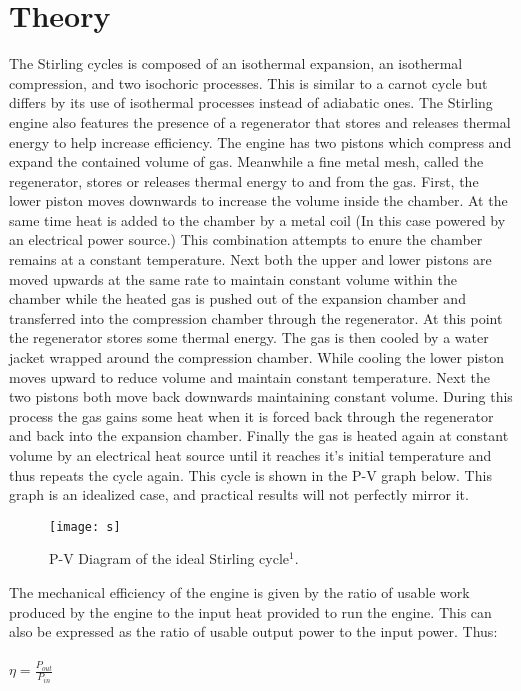 \documentclass{article}
\begin{document}
\section{Theory}
The Stirling cycles is composed of an isothermal expansion, an isothermal compression, and two isochoric processes. This is similar to a carnot cycle but differs by its use of isothermal processes instead of adiabatic ones. The Stirling engine also features the presence of a regenerator that stores and releases thermal energy to help increase efficiency. The engine has two pistons which compress and expand the contained volume of gas. Meanwhile a fine metal mesh, called the regenerator, stores or releases thermal energy to and from the gas. First, the lower piston moves downwards to increase the volume inside the chamber. At the same time heat is added to the chamber by a metal coil (In this case powered by an electrical power source.) This combination attempts to enure the chamber remains at a constant temperature. Next both the upper and lower pistons are moved upwards at the same rate to maintain constant volume within the chamber while the heated gas is pushed out of the expansion chamber and transferred into the compression chamber through the regenerator. At this point the regenerator stores some thermal energy. The gas is then cooled by a water jacket wrapped around the compression chamber. While cooling the lower piston moves upward to reduce volume and maintain constant temperature. Next the two pistons both move back downwards maintaining constant volume. During this process the gas gains some heat when it is forced back through the regenerator and back into the expansion chamber. Finally the gas is heated again at constant volume by an electrical heat source until it reaches it's initial temperature and thus repeats the cycle again. This cycle is shown in the P-V graph below. This graph is an idealized case, and practical results will not perfectly mirror it.

\begin{figure}[h]
\begin{center}
\texttt{[image: s]} %
\caption{P-V Diagram of the ideal Stirling cycle$^1$.}
\end{center}
\end{figure}

The mechanical efficiency of the engine is given by the ratio of usable work produced by the engine to the input heat provided to run the engine. This can also be expressed as the ratio of usable output power to the input power. Thus:\\\\
$\eta=\frac{P_{out}}{P_{in}}$\\
\end{document}
